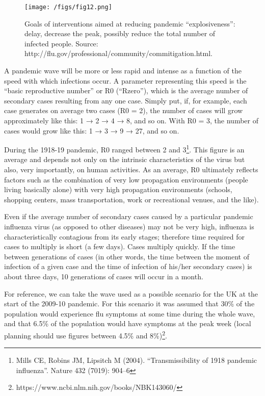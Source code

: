 \documentclass[12pt, a4]{scrartcl}
\begin{document}
\begin{figure}[h]
\centering
\texttt{[image: /figs/fig12.png]}
\caption{Goals of interventions aimed at reducing pandemic “explosiveness”: delay, decrease the peak, possibly reduce the total number of infected people. Source: http://flu.gov/professional/community/commitigation.html.}
\end{figure}

A pandemic wave will be more or less rapid and intense as a function of the speed with which infections occur. A parameter representing this speed is the “basic reproductive number” or R0 (“Rzero”), which is the average number of secondary cases resulting from any one case. Simply put, if, for example, each case generates on average two cases (R0 = 2), the number of cases will grow approximately like this: 1 → 2 → 4 → 8, and so on. With R0 = 3, the number of cases would grow like this: 1 → 3 → 9 → 27, and so on.

During the 1918-19 pandemic, R0 ranged between 2 and 3\footnote{Mills CE, Robins JM, Lipsitch M (2004). “Transmissibility of 1918 pandemic influenza”. Nature 432 (7019): 904–6}. This figure is an average and depends not only on the intrinsic characteristics of the virus but also, very importantly, on human activities. As an average, R0 ultimately reflects factors such as the combination of very low propagation environments (people living basically alone) with very high propagation environments (schools, shopping centers, mass transportation, work or recreational venues, and the like).

Even if the average number of secondary cases caused by a particular pandemic influenza virus (as opposed to other diseases) may not be very high, influenza is characteristically contagious from its early stages; therefore time required for cases to multiply is short (a few days). Cases multiply quickly. If the time between generations of cases (in other words, the time between the moment of infection of a given case and the time of infection of his/her secondary cases) is about three days, 10 generations of cases will occur in a month.

For reference, we can take the wave used as a possible scenario for the UK at the start of the 2009-10 pandemic. For this scenario it was assumed that 30\% of the population would experience flu symptoms at some time during the whole wave, and that 6.5\% of the population would have symptoms at the peak week (local planning should use figures between 4.5\% and 8\%)\footnote{https://www.ncbi.nlm.nih.gov/books/NBK143060/}.
\end{document}
